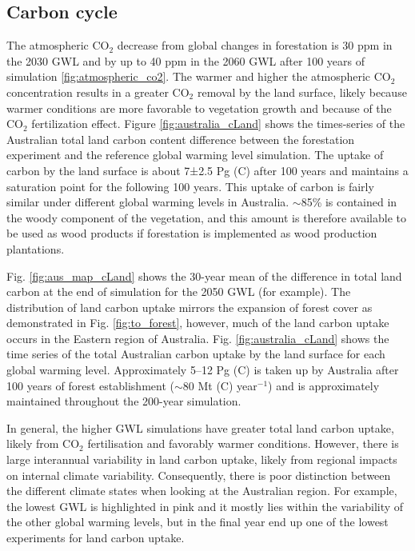 \documentclass[]{article}
\begin{document}
\subsection{Carbon cycle}

The atmospheric CO$_2$ decrease from global changes in forestation is 30 ppm in the 2030 GWL and by up to 40 ppm in the 2060 GWL after 100 years of simulation \ref{fig:atmospheric_co2}.
The warmer and higher the atmospheric CO$_2$ concentration results in a greater CO$_2$ removal by the land surface, likely because warmer conditions are more favorable to vegetation growth and because of the CO$_2$ fertilization effect.
Figure \ref{fig:australia_cLand} shows the times-series of the Australian total land carbon content difference between the forestation experiment and the reference global warming level simulation.
The uptake of carbon by the land surface is about 7±2.5 Pg (C) after 100 years and maintains a saturation point for the following 100 years.
This uptake of carbon is fairly similar under different global warming levels in Australia.
$\sim$85\% is contained in the woody component of the vegetation, and this amount is therefore available to be used as wood products if forestation is implemented as wood production plantations.

Fig. \ref{fig:aus_map_cLand} shows the 30-year mean of the difference in total land carbon at the end of simulation for the 2050 GWL (for example).
The distribution of land carbon uptake mirrors the expansion of forest cover as demonstrated in Fig. \ref{fig:to_forest}, however, much of the land carbon uptake occurs in the Eastern region of Australia.
Fig. \ref{fig:australia_cLand} shows the time series of the total Australian carbon uptake by the land surface for each global warming level.
Approximately 5--12 Pg (C) is taken up by Australia after 100 years of forest establishment ($\sim$80 Mt (C) year$^{-1}$) and is approximately maintained throughout the 200-year simulation.

In general, the higher GWL simulations have greater total land carbon uptake, likely from CO$_2$ fertilisation and favorably warmer conditions.
However, there is large interannual variability in land carbon uptake, likely from regional impacts on internal climate variability.
Consequently, there is poor distinction between the different climate states when looking at the Australian region.
For example, the lowest GWL is highlighted in pink and it mostly lies within the variability of the other global warming levels, but in the final year end up one of the lowest experiments for land carbon uptake.
\end{document}
